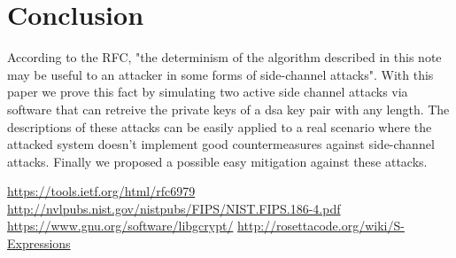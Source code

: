 \documentclass[11pt,english]{article}
\begin{document}
\section{Conclusion}
According to the RFC\cite{rfc}, "the determinism of the algorithm described in this note may be useful to an attacker in some forms of side-channel attacks". With this paper we prove this fact by simulating two active side channel attacks via software that can retreive the private keys of a dsa key pair with any length. The descriptions of these attacks can be easily applied to a real scenario where the attacked system doesn't implement good countermeasures against side-channel attacks. Finally we proposed a possible easy mitigation against these attacks. 

\begin{thebibliography}{10}
 \url{https://tools.ietf.org/html/rfc6979}
 \url{http://nvlpubs.nist.gov/nistpubs/FIPS/NIST.FIPS.186-4.pdf}
 \url{https://www.gnu.org/software/libgcrypt/}
 \url{http://rosettacode.org/wiki/S-Expressions}
\end{thebibliography}
\end{document}
